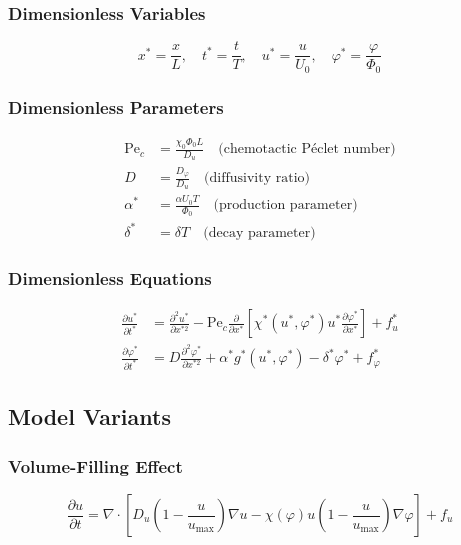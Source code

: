 \documentclass[11pt,a4paper]{article}
\begin{document}
\subsubsection{Dimensionless Variables}
\begin{equation}
x^* = \frac{x}{L}, \quad t^* = \frac{t}{T}, \quad u^* = \frac{u}{U_0}, \quad \varphi^* = \frac{\varphi}{\Phi_0}
\end{equation}

\subsubsection{Dimensionless Parameters}
\begin{align}
\text{Pe}_c &= \frac{\chi_0 \Phi_0 L}{D_u} \quad \text{(chemotactic Péclet number)}\\
D &= \frac{D_\varphi}{D_u} \quad \text{(diffusivity ratio)}\\
\alpha^* &= \frac{\alpha U_0 T}{\Phi_0} \quad \text{(production parameter)}\\
\delta^* &= \delta T \quad \text{(decay parameter)}
\end{align}

\subsubsection{Dimensionless Equations}
\begin{align}
\frac{\partial u^*}{\partial t^*} &= \frac{\partial^2 u^*}{\partial x^{*2}} - \text{Pe}_c \frac{\partial}{\partial x^*}\left[\chi^*(u^*,\varphi^*) u^* \frac{\partial \varphi^*}{\partial x^*}\right] + f_u^*\\
\frac{\partial \varphi^*}{\partial t^*} &= D \frac{\partial^2 \varphi^*}{\partial x^{*2}} + \alpha^* g^*(u^*,\varphi^*) - \delta^* \varphi^* + f_\varphi^*
\end{align}

\subsection{Model Variants}

\subsubsection{Volume-Filling Effect}
\begin{equation}
\frac{\partial u}{\partial t} = \nabla \cdot \left[D_u\left(1-\frac{u}{u_{\max}}\right)\nabla u - \chi(\varphi)u\left(1-\frac{u}{u_{\max}}\right)\nabla\varphi\right] + f_u
\end{equation}
\end{document}
